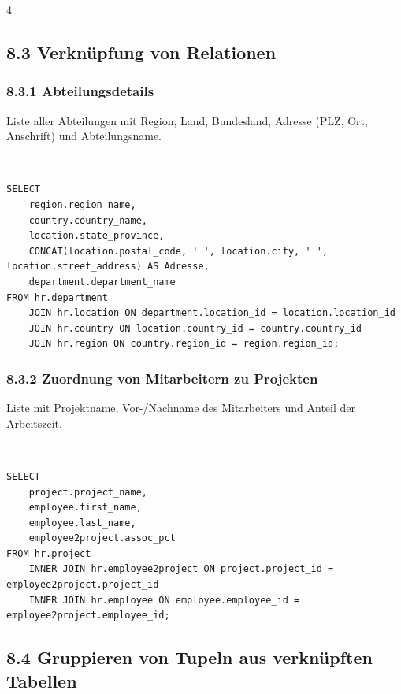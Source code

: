 \documentclass[8pt,a4paper]{extarticle}
\newenvironment{loesung}[1][]{%
    \par\noindent{\bfseries\color{loesungrahmen}\small$\blacktriangleright$~L\"osung#1:}~%
}{\par\smallskip}
\begin{document}
\begin{multicols}{4}
\subsection*{8.3 \quad Verkn\"upfung von Relationen}
\subsubsection*{8.3.1 \quad Abteilungsdetails}
Liste aller Abteilungen mit Region, Land, Bundesland, Adresse (PLZ, Ort, Anschrift) und Abteilungsname.
\begin{loesung}
\begin{lstlisting}
SELECT
    region.region_name,
    country.country_name,
    location.state_province,
    CONCAT(location.postal_code, ' ', location.city, ' ', location.street_address) AS Adresse,
    department.department_name
FROM hr.department
    JOIN hr.location ON department.location_id = location.location_id
    JOIN hr.country ON location.country_id = country.country_id
    JOIN hr.region ON country.region_id = region.region_id;
\end{lstlisting}
\end{loesung}

\subsubsection*{8.3.2 \quad Zuordnung von Mitarbeitern zu Projekten}
Liste mit Projektname, Vor-/Nachname des Mitarbeiters und Anteil der Arbeitszeit.
\begin{loesung}
\begin{lstlisting}
SELECT
    project.project_name,
    employee.first_name,
    employee.last_name,
    employee2project.assoc_pct
FROM hr.project
    INNER JOIN hr.employee2project ON project.project_id = employee2project.project_id
    INNER JOIN hr.employee ON employee.employee_id = employee2project.employee_id;
\end{lstlisting}
\end{loesung}

\subsection*{8.4 \quad Gruppieren von Tupeln aus verkn\"upften Tabellen}

\end{multicols}
\end{document}
